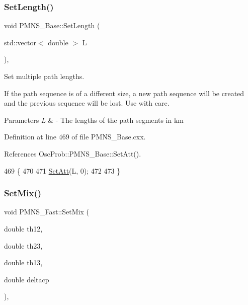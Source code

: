 \subsubsection{\texorpdfstring{Set\+Length()}{SetLength()}\hspace{0.1cm}{\footnotesize\ttfamily [2/2]}}
{\footnotesize\ttfamily void P\+M\+N\+S\+\_\+\+Base\+::\+Set\+Length (\begin{DoxyParamCaption}\item[{std\+::vector$<$ double $>$}]{L }\end{DoxyParamCaption})\hspace{0.3cm}{\ttfamily [virtual]}, {\ttfamily [inherited]}}

Set multiple path lengths.

If the path sequence is of a different size, a new path sequence will be created and the previous sequence will be lost. Use with care.


\begin{DoxyParams}{Parameters}
{\em L} & -\/ The lengths of the path segments in km \\
\hline
\end{DoxyParams}


Definition at line 469 of file P\+M\+N\+S\+\_\+\+Base.\+cxx.



References Osc\+Prob\+::\+P\+M\+N\+S\+\_\+\+Base\+::\+Set\+Att().


\begin{DoxyCode}
469                                             \{
470 
471   \hyperlink{classOscProb_1_1PMNS__Base_aba565962a440d14bee7a2a96d2eca2c5}{SetAtt}(L, 0);
472 
473 \}
\end{DoxyCode}
\mbox{\label{classOscProb_1_1PMNS__Fast_ad849b2231d99c5d66fb3ade8efb896e1}} 
\subsubsection{\texorpdfstring{Set\+Mix()}{SetMix()}}
{\footnotesize\ttfamily void P\+M\+N\+S\+\_\+\+Fast\+::\+Set\+Mix (\begin{DoxyParamCaption}\item[{double}]{th12,  }\item[{double}]{th23,  }\item[{double}]{th13,  }\item[{double}]{deltacp }\end{DoxyParamCaption})\hspace{0.3cm}{\ttfamily [virtual]}, {\ttfamily [inherited]}}

